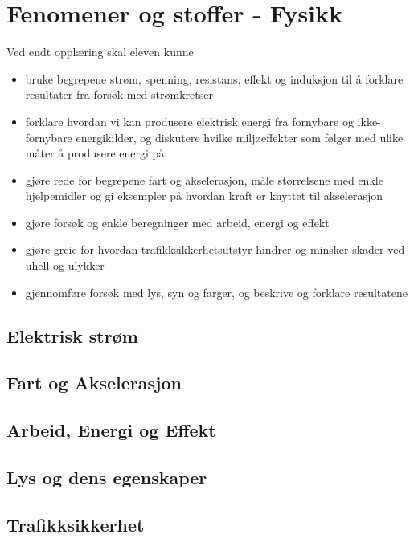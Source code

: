 \documentclass[main.tex]{subfiles}
\begin{document}
\section{Fenomener og stoffer - Fysikk} 
Ved endt opplæring skal eleven kunne
\begin{itemize}[noitemsep]
\item bruke begrepene strøm, spenning, resistans, effekt og induksjon til å forklare resultater fra forsøk med strømkretser
\item forklare hvordan vi kan produsere elektrisk energi fra fornybare og ikke-fornybare energikilder, og diskutere hvilke miljøeffekter som følger med ulike måter å produsere energi på
\item gjøre rede for begrepene fart og akselerasjon, måle størrelsene med enkle hjelpemidler og gi eksempler på hvordan kraft er knyttet til akselerasjon
\item gjøre forsøk og enkle beregninger med arbeid, energi og effekt
\item gjøre greie for hvordan trafikksikkerhetsutstyr hindrer og minsker skader ved uhell og ulykker
\item gjennomføre forsøk med lys, syn og farger, og beskrive og forklare resultatene
\end{itemize}

\subsection{Elektrisk strøm}

\subsection{Fart og Akselerasjon}

\subsection{Arbeid, Energi og Effekt}

\subsection{Lys og dens egenskaper}

\subsection{Trafikksikkerhet}
\end{document}

